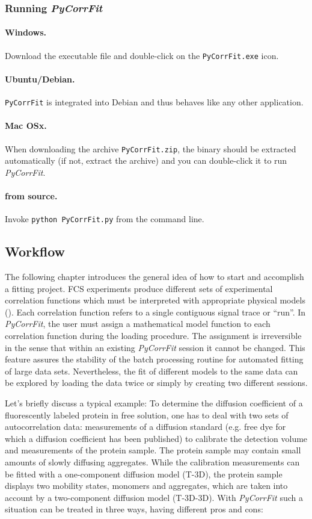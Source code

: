 \subsubsection{Running \textit{PyCorrFit}}
\label{sec:intro.runni}
\paragraph*{Windows.}
Download the executable file and double-click on the \texttt{PyCorrFit.exe} icon.
\paragraph*{Ubuntu/Debian.}
\texttt{PyCorrFit} is integrated into Debian and thus behaves like any other application.
\paragraph*{Mac OSx.}
When downloading the archive \texttt{PyCorrFit.zip}, the binary should be extracted automatically (if not, extract the archive) and you can double-click it to run \textit{PyCorrFit}.
\paragraph*{from source.}
Invoke \texttt{python PyCorrFit.py} from the command line.

\subsection{Workflow}
\label{sec:intro.workf}

The following chapter introduces the general idea of how to start and accomplish a fitting project. FCS experiments produce different sets of experimental correlation functions which must be interpreted with appropriate physical models (). Each correlation function refers to a single contiguous signal trace or ``run''. In \textit{PyCorrFit}, the user must assign a mathematical model function to each correlation function during the loading procedure. The assignment is irreversible in the sense that within an existing \textit{PyCorrFit} session it cannot be changed. This feature assures the stability of the batch processing routine for automated fitting of large data sets. Nevertheless, the fit of different models to the same data can be explored by loading the data twice or simply by creating two different sessions.

Let's briefly discuss a typical example: To determine the diffusion coefficient of a fluorescently labeled protein in free solution, one has to deal with two sets of autocorrelation data: measurements of a diffusion standard (e.g. free dye for which a diffusion coefficient has been published) to calibrate the detection volume and measurements of the protein sample. The protein sample may contain small amounts of slowly diffusing aggregates. While the calibration measurements can be fitted with a one-component diffusion model (T-3D), the protein sample displays two mobility states, monomers and aggregates, which are taken into account by a two-component diffusion model (T-3D-3D). With \textit{PyCorrFit} such a situation can be treated in three ways, having different pros and cons: 


